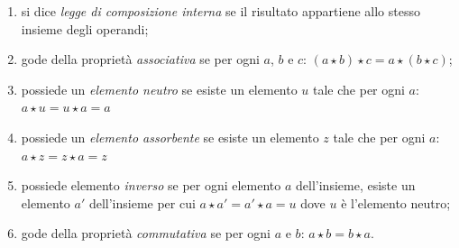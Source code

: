 \begin{enumerate} [noitemsep]
\item si dice \emph{legge di composizione interna}  se
il risultato appartiene allo stesso insieme degli operandi;
\item gode della proprietà \emph{associativa} 
se per ogni \(a\), \(b\) e \(c\): 
\((a \star b) \star c = a \star (b \star c)\);
\item possiede un \emph{elemento neutro} 
se esiste un elemento \(u\) 
tale che per ogni \(a\): \(a \star u = u \star a = a\)
\item possiede un \emph{elemento assorbente} se esiste un elemento \(z\) 
tale che per ogni \(a\): \(a \star z = z \star a = z\)
\item possiede elemento \emph{inverso} 
se per ogni elemento \(a\) dell'insieme, esiste un elemento \(a'\) 
dell'insieme per cui \(a \star a' = a' \star a = u\) dove \(u\) è 
l'elemento neutro;
\item gode della proprietà \emph{commutativa} 
se per ogni \(a\) e \(b\): \(a \star b = b \star a\).
\end{enumerate}

% 
% 
% 

